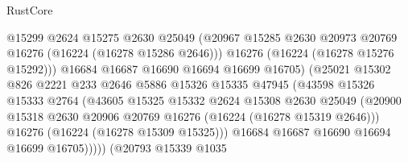 \begin{lexlean}{RustCore}
\begin{coremodule}
                                    @15299
                                    @2624
                                    @15275
                                    @2630
                                    @25049
                                    (@20967
                                      @15285
                                      @2630
                                      @20973
                                      @20769
                                      @16276
                                      (@16224 (@16278 @15286 @2646)))
                                    @16276
                                    (@16224 (@16278 @15276 @15292)))
                                  @16684
                                  @16687
                                  @16690
                                  @16694
                                  @16699
                                  @16705)
                                (@25021
                                  @15302
                                  @826
                                  @2221
                                  @233
                                  @2646
                                  @5886
                                  @15326
                                  @15335
                                  @47945
                                  (@43598
                                    @15326
                                    @15333
                                    @2764
                                    (@43605
                                      @15325
                                      @15332
                                      @2624
                                      @15308
                                      @2630
                                      @25049
                                      (@20900
                                        @15318
                                        @2630
                                        @20906
                                        @20769
                                        @16276
                                        (@16224 (@16278 @15319 @2646)))
                                      @16276
                                      (@16224 (@16278 @15309 @15325)))
                                    @16684
                                    @16687
                                    @16690
                                    @16694
                                    @16699
                                    @16705)))))
                          (@20793
                            @15339
                            @1035

\end{coremodule}
\end{lexlean}
